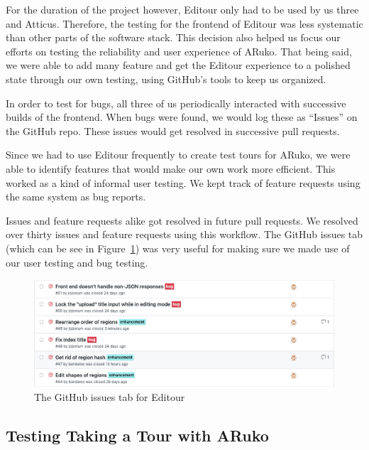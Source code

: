 \documentclass[a4paper, 10pt, american, titlepage]{article}
\begin{document}
For the duration of the project however, Editour only had to be used by us
three and Atticus. Therefore, the testing for the frontend of Editour was less
systematic than other parts of the software stack. This decision also helped us
focus our efforts on testing the reliability and user experience of ARuko. That
being said, we were able to add many feature and get the Editour experience to
a polished state through our own testing, using GitHub's tools to keep us
organized.

In order to test for bugs, all three of us periodically interacted with
successive builds of the frontend. When bugs were found, we would log these as
``Issues'' on the GitHub repo. These issues would get resolved in successive
pull requests.

Since we had to use Editour frequently to create test tours for ARuko, we were
able to identify features that would make our own work more efficient. This
worked as a kind of informal user testing. We kept track of feature requests
using the same system as bug reports.

Issues and feature requests alike got resolved in future pull requests. We
resolved over thirty issues and feature requests using this workflow. The
GitHub issues tab (which can be see in Figure~\ref{fig:issuesPageExample}) was
very useful for making sure we made use of our user testing and bug testing.

\begin{figure}[h]
	\centering
	\includegraphics[width=\textwidth]{issues-page-example.png}
	\caption{The GitHub issues tab for Editour}
	\label{fig:issuesPageExample}
\end{figure}

\subsection{Testing Taking a Tour with ARuko}
\label{sec:testingARuko}
\end{document}
